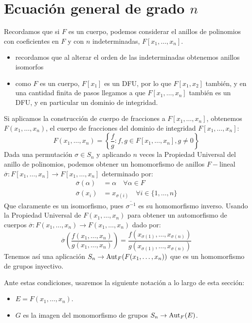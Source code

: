 \section{Ecuación general de grado $n$} %
\noindent
Recordamos que si $F$ es un cuerpo, podemos considerar el anillos de polinomios con coeficientes en $F$ y con $n$ indeterminadas, $F[x_1,\ldots,x_n]$.
\begin{itemize}
    \item recordamos que al alterar el orden de las indeterminadas obtenemos anillos isomorfos
    \item como $F$ es un cuerpo, $F[x_1]$ es un DFU, por lo que $F[x_1,x_2]$ también, y en una cantidad finita de pasos llegamos a que $F[x_1,\ldots,x_n]$ también es un DFU, y en particular un dominio de integridad.
\end{itemize}
Si aplicamos la construcción de cuerpo de fracciones a $F[x_1,\ldots,x_n]$, obtenemos $F(x_1,\ldots, x_n)$, el cuerpo de fracciones del dominio de integridad $F[x_1,\ldots, x_n]$:
\begin{equation*}
    F(x_1,\ldots,x_n) = \left\{\frac{f}{g} : f,g\in F[x_1,\ldots,x_n], g\neq 0\right\}
\end{equation*}
Dada una permutación $\sigma\in S_n$ y aplicando $n$ veces la Propiedad Universal del anillo de polinomios, podemos obtener un homomorfismo de anillos $F-$lineal\newline $\overline{\sigma}:F[x_1,\ldots,x_n]\to F[x_1,\ldots,x_n]$ determinado por:
\begin{align*}
    \overline{\sigma}(\alpha) &= \alpha \quad \forall \alpha\in F \\
    \overline{\sigma}(x_i) &= x_{\sigma(i)} \quad \forall i \in \{1,\ldots,n\}
\end{align*}
Que claramente es un isomorfismo, pues $\overline{\sigma^{-1}}$ es su homomorfismo inverso. Usando la Propiedad Universal de $F(x_1,\ldots,x_n)$ para obtener un automorfismo de cuerpos $\overline{\sigma}:F(x_1,\ldots,x_n)\to F(x_1,\ldots,x_n)$ dado por:
\begin{equation*}
    \overline{\sigma}\left(\frac{f(x_1,\ldots,x_n)}{g(x_1,\ldots,x_n)}\right) = \frac{f(x_{\sigma(1)}, \ldots, x_{\sigma(n)})}{g(x_{\sigma(1)}, \ldots, x_{\sigma(n)})}
\end{equation*}
Tenemos así una aplicación $S_n\to \operatorname{Aut}_F(F(x_1,\ldots,x_n))$ que es un homomorfismo de grupos inyectivo.

\begin{notacion}
    Ante estas condiciones, usaremos la siguiente notación a lo largo de esta sección:
    \begin{itemize}
        \item $E = F(x_1,\ldots,x_n)$.
        \item $G$ es la imagen del monomorfismo de grupos $S_n\to \operatorname{Aut}_F(E)$.
    \end{itemize}
\end{notacion}

